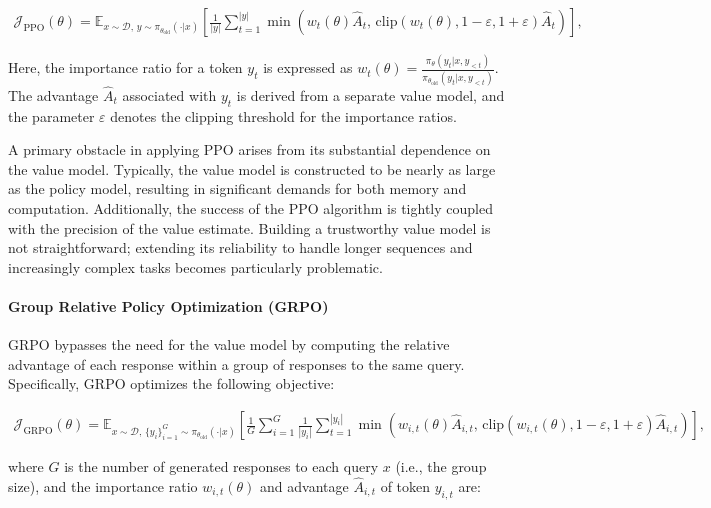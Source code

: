 \begin{align}
\mathcal{J}_\text{PPO}(\theta) = \mathbb{E}_{ x \sim \mathcal{D},\, y \sim \pi_{\theta_\text{old}}( \cdot | x) }
\left[ \frac{1}{|y|} \sum_{t=1}^{|y|} 
\min \left( w_{t}(\theta) \widehat{A}_{t},  \, \mathrm{clip} \left( w_{t}(\theta), 1 - {\varepsilon}, 1 + {\varepsilon}\right) \widehat{A}_{t} \right)
\right],
\end{align}

Here, the importance ratio for a token $y_t$ is expressed as $
w_{t}(\theta) = \frac{ \pi_{\theta} (y_{t} | x, y_{<t}) }{ \pi_{\theta_\text{old}} (y_{t} | x,y_{<t})} $. The advantage $\widehat{A}_{t}$ associated with $y_t$ is derived from a separate value model, and the parameter $\varepsilon$ denotes the clipping threshold for the importance ratios.

A primary obstacle in applying PPO arises from its substantial dependence on the value model. Typically, the value model is constructed to be nearly as large as the policy model, resulting in significant demands for both memory and computation. Additionally, the success of the PPO algorithm is tightly coupled with the precision of the value estimate. Building a trustworthy value model is not straightforward; extending its reliability to handle longer sequences and increasingly complex tasks becomes particularly problematic.

\paragraph{Group Relative Policy Optimization (GRPO)} GRPO \citep{grpo} bypasses the need for the value model by computing the relative advantage of each response within a group of responses to the same query. Specifically, GRPO optimizes the following objective:

\begin{align}
\label{equ:grpo}
\mathcal{J}_\text{GRPO}(\theta) = \mathbb{E}_{ x \sim \mathcal{D},\, \{y_i\}_{i=1}^G \sim \pi_{\theta_\text{old}}( \cdot | x) }
\left[ \frac{1}{G} \sum_{i=1}^{G} \frac{1}{|y_i|} \sum_{t=1}^{|y_i|} 
\min \left( w_{i,t}(\theta) \widehat{A}_{i,t},  \, \mathrm{clip} \left( w_{i,t}(\theta), 1 - {\varepsilon}, 1 + {\varepsilon}\right) \widehat{A}_{i,t} \right)
\right],
\end{align}

where $G$ is the number of generated responses to each query $x$ (i.e., the group size), and the importance ratio $w_{i,t}(\theta)$ and advantage $\widehat{A}_{i,t}$ of token $y_{i,t}$ are:

